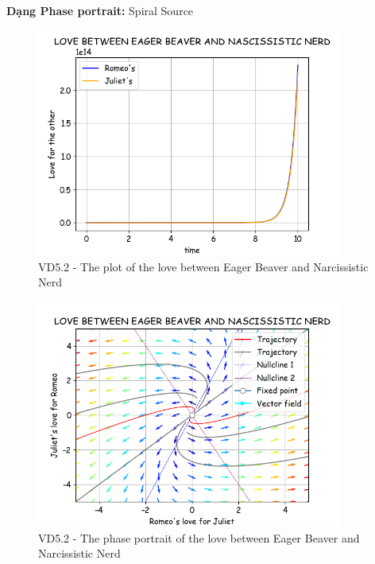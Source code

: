 \textbf{Dạng Phase portrait: } Spiral Source
\pagebreak
\begin{figure}[!htbp]
    \centering
    \includegraphics[width=100mm]{image/bt2/plot5.2.png}
    \caption{VD5.2 - The plot of the love between Eager Beaver and Narcissistic Nerd}
\end{figure}
\begin{figure}[!htbp]
    \centering
    \includegraphics[width=100mm]{image/bt2/pp5.2.png}
    \caption{VD5.2 - The phase portrait of the love between Eager Beaver and Narcissistic Nerd}
\end{figure}

